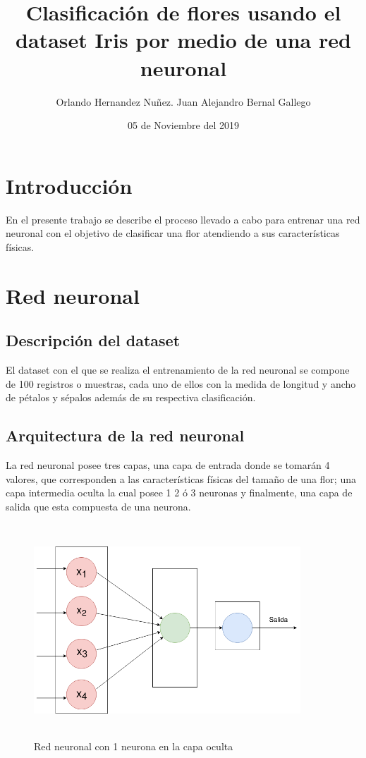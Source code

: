 \documentclass[11pt]{article}
\begin{document}
\title{ Clasificaci\'on de flores usando el dataset Iris por medio de una red neuronal }
\author{Orlando Hernandez Nu\~nez. Juan Alejandro Bernal Gallego}
\date{05 de Noviembre del 2019}
\maketitle
\section{Introducci\'on}
En el presente trabajo se describe el proceso llevado a cabo para entrenar una red neuronal con el objetivo de clasificar una flor atendiendo a sus caracter\'isticas f\'isicas.
\section{Red neuronal}
\subsection{Descripci\'on del dataset}
El dataset con el que se realiza el entrenamiento de la red neuronal se compone de 100 registros o muestras,
cada uno de ellos con la medida de longitud y ancho de p\'etalos y s\'epalos adem\'as de su respectiva clasificaci\'on.
\subsection{Arquitectura de la red neuronal}
La red neuronal posee tres capas, una capa de entrada donde se tomar\'an 4 valores, que corresponden a las caracter\'isticas físicas del tama\~no de una flor; una capa intermedia oculta la cual
posee 1 2 \'o 3 neuronas y finalmente, una capa de salida que esta compuesta de una neurona.
\begin{figure}[h]
    \includegraphics[width=10cm, height=8cm]{1hn}
    \centering
    \caption{Red neuronal con 1 neurona en la capa oculta}
    \label{1hn}
\end{figure}
\end{document}
